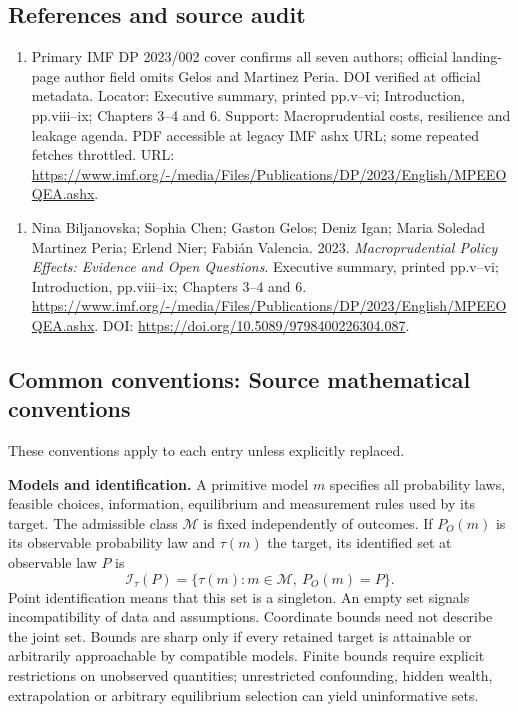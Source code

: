\documentclass[11pt,a4paper]{article}
\begin{document}
\subsection*{References and source audit}
\begin{enumerate}
\item Primary IMF DP 2023/002 cover confirms all seven authors; official landing-page author field omits Gelos and Martinez Peria. DOI verified at official metadata. Locator: Executive summary, printed pp.v--vi; Introduction, pp.viii--ix; Chapters 3--4 and 6. Support: Macroprudential costs, resilience and leakage agenda. PDF accessible at legacy IMF ashx URL; some repeated fetches throttled. URL: \url{https://www.imf.org/-/media/Files/Publications/DP/2023/English/MPEEOQEA.ashx}.
\end{enumerate}
\begin{enumerate}\raggedright
\item\hypertarget{definitions:source:30007606:1}{} Nina Biljanovska; Sophia Chen; Gaston Gelos; Deniz Igan; Maria Soledad Martinez Peria; Erlend Nier; Fabián Valencia. 2023. \emph{Macroprudential Policy Effects: Evidence and Open Questions}. Executive summary, printed pp.v--vi; Introduction, pp.viii--ix; Chapters 3--4 and 6.
\url{https://www.imf.org/-/media/Files/Publications/DP/2023/English/MPEEOQEA.ashx}.
DOI: \url{https://doi.org/10.5089/9798400226304.087}.
\end{enumerate}

\subsection*{Common conventions: Source mathematical conventions}

These conventions apply to each entry unless explicitly replaced.

\textbf{Models and identification.} A primitive model \(m\) specifies all probability laws, feasible choices, information, equilibrium and measurement rules used by its target. The admissible class \(\mathcal M\) is fixed independently of outcomes. If \(P_O(m)\) is its observable probability law and \(\tau(m)\) the target, its identified set at observable law \(P\) is
\[
 \mathcal I_\tau(P)=\{\tau(m):m\in\mathcal M,\ P_O(m)=P\}.
\]
Point identification means that this set is a singleton. An empty set signals incompatibility of data and assumptions. Coordinate bounds need not describe the joint set. Bounds are sharp only if every retained target is attainable or arbitrarily approachable by compatible models. Finite bounds require explicit restrictions on unobserved quantities; unrestricted confounding, hidden wealth, extrapolation or arbitrary equilibrium selection can yield uninformative sets.
\end{document}
